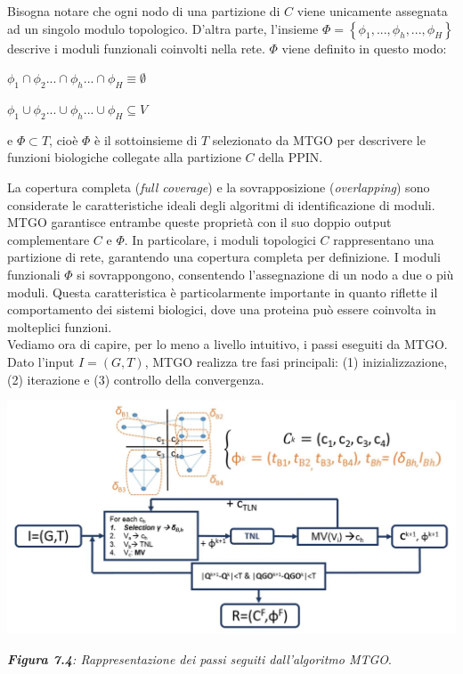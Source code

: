 \documentclass[11pt]{article}
\begin{document}
Bisogna notare che ogni nodo di una partizione di $C$ viene unicamente assegnata ad un singolo modulo topologico. D'altra parte, l'insieme $\Phi = \left \{\phi_1, ..., \phi_h, ..., \phi_H\right \}$ descrive i moduli funzionali coinvolti nella rete. $\Phi$ viene definito in questo modo:

\begin{center}
$\phi_1 \cap \phi_2 ... \cap \phi_h ... \cap \phi_H \equiv \emptyset$
\end{center}
\begin{center}
 $\phi_1 \cup \phi_2 ... \cup \phi_h ... \cup \phi_H \subseteq V$
\end{center}

e $\Phi \subset T$, cioè $\Phi$ è il sottoinsieme di $T$ selezionato da MTGO per descrivere le funzioni biologiche collegate alla partizione $C$ della PPIN.

La copertura completa (\textit{full coverage}) e la sovrapposizione (\textit{overlapping}) sono considerate le caratteristiche ideali degli algoritmi di identificazione di moduli. MTGO garantisce entrambe queste proprietà con il suo doppio output complementare $C$ e $\Phi$. In particolare, i moduli topologici $C$ rappresentano una partizione di rete, garantendo una copertura completa per definizione. I moduli funzionali $\Phi$ si sovrappongono, consentendo l'assegnazione di un nodo a due o più moduli. Questa caratteristica è particolarmente importante in quanto riflette il comportamento dei sistemi biologici, dove una proteina può essere coinvolta in molteplici funzioni.\\

Vediamo ora di capire, per lo meno a livello intuitivo, i passi eseguiti da MTGO.
Dato l'input $I = (G,T)$, MTGO realizza tre fasi principali: (1) inizializzazione, (2) iterazione e (3) controllo della convergenza.

\begin{center}
\includegraphics[scale=0.37]{algMTGO}

\begin{small}\textit{\textbf{Figura 7.4}: Rappresentazione dei passi seguiti dall'algoritmo MTGO}.\end{small}
\end{center}
\end{document}

